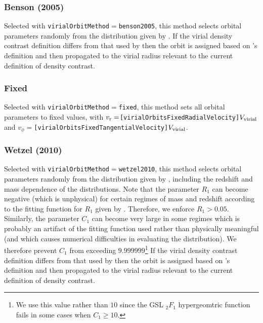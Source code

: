 \subsubsection{Benson (2005)}\label{phys:virialOrbit:virialOrbitBenson2005}

Selected with {\tt virialOrbitMethod}$=${\tt benson2005}, this method selects orbital parameters randomly from the distribution given by \cite{benson_orbital_2005}. If the virial density contrast definition differs from that used by \cite{benson_orbital_2005} then the orbit is assigned based on \cite{benson_orbital_2005}'s definition and then propagated to the virial radius relevant to the current definition of density contrast.

\subsubsection{Fixed}\label{phys:virialOrbit:virialOrbitFixed}

Selected with {\tt virialOrbitMethod}$=${\tt fixed}, this method sets all orbital parameters to fixed values, with $v_{\rm r}=${\tt [virialOrbitsFixedRadialVelocity]}$V_{\rm virial}$ and  $v_\phi=${\tt [virialOrbitsFixedTangentialVelocity]}$V_{\rm virial}$.

\subsubsection{Wetzel (2010)}\label{phys:virialOrbit:virialOrbitWetzel2010}

Selected with {\tt virialOrbitMethod}$=${\tt wetzel2010}, this method selects orbital parameters randomly from the distribution given by \cite{wetzel_orbits_2010}, including the redshift and mass dependence of the distributions. Note that the parameter $R_1$ can become negative (which is unphysical) for certain regimes of mass and redshift according to the fitting function for $R_1$ given by \cite{wetzel_orbits_2010}. Therefore, we enforce $R_1>0.05$. Similarly, the parameter $C_1$ can become very large in some regimes which is probably an artifact of the fitting function used rather than physically meaningful (and which causes numerical difficulties in evaluating the distribution). We therefore prevent $C_1$ from exceeding $9.999999$\footnote{We use this value rather than $10$ since the GSL $_2F_1$ hypergeomtric function fails in some cases when $C_1\ge 10$.} If the virial density contrast definition differs from that used by \cite{wetzel_orbits_2010} then the orbit is assigned based on \cite{wetzel_orbits_2010}'s definition and then propagated to the virial radius relevant to the current definition of density contrast.

